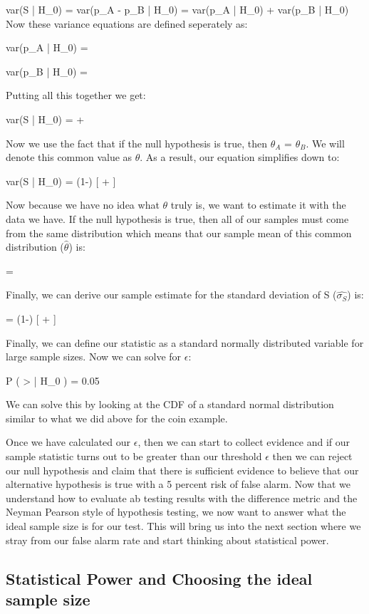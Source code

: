 \beq
var(S | H_0) = var(p_A - p_B | H_0) = var(p_A | H_0) + var(p_B | H_0) 
\eeq
Now these variance equations are defined seperately as: 

\beq
var(p_A | H_0) = 
\eeq

\beq
var(p_B | H_0) = 
\eeq

Putting all this together we get:

\beq
var(S | H_0) =  + 
\eeq

Now we use the fact that if the null hypothesis is true, then $\theta_A$ = $\theta_B$. We will denote this common
value as $\theta$. As a result, our equation simplifies down to:

\beq
var(S | H_0) = \theta(1-\theta) [ + ]
\eeq

Now because we have no idea what $\theta$ truly is, we want to estimate it with the data we have. If the null hypothesis is
true, then all of our samples must come from the same distribution which means that our sample mean of this common distribution
($\hat{\theta}$) is:

\beq
\hat{\theta} = 
\eeq

Finally, we can derive our sample estimate for the standard deviation of S ($\hat{\sigma_S}$) is:

\beq
{} = \hat{\theta}(1-\hat{\theta}) [ + ]
\eeq

Finally, we can define our statistic as a standard normally distributed variable for large sample sizes.
Now we can solve for $\epsilon$:

\beq
P (  > \epsilon | H_0 ) = 0.05
\eeq

We can solve this by looking at the CDF of a standard normal distribution similar to what we did above for the coin example.

Once we have calculated our $\epsilon$, then we can start to collect evidence and if our sample statistic turns out to be greater
than our threshold $\epsilon$ then we can reject our null hypothesis and claim that there is sufficient evidence to believe that
our alternative hypothesis is true with a 5 percent risk of false alarm. Now that we understand how to evaluate ab testing results
with the difference metric and the Neyman Pearson style of hypothesis testing, we now want to answer what the ideal sample size is 
for our test. This will bring us into the next section where we stray from our false alarm rate and start thinking about statistical
power.

\subsection{Statistical Power and Choosing the ideal sample size} 







